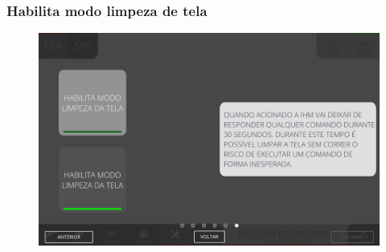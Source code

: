 \newpage
\thispagestyle{fancy}
\vspace*{40 pt}
\subsubsection{\small{Habilita modo limpeza de tela}} \label{sec:telaConfiguracaoTelaHabilitaModoLimpezaTela} 
\vspace*{\fill}
\begin{figure}[h]
    \centering
    \includegraphics[width=576 px,height=360 px]{src/imagesICV/10-configuration/6.png}
\end{figure}
\vspace*{\fill}



